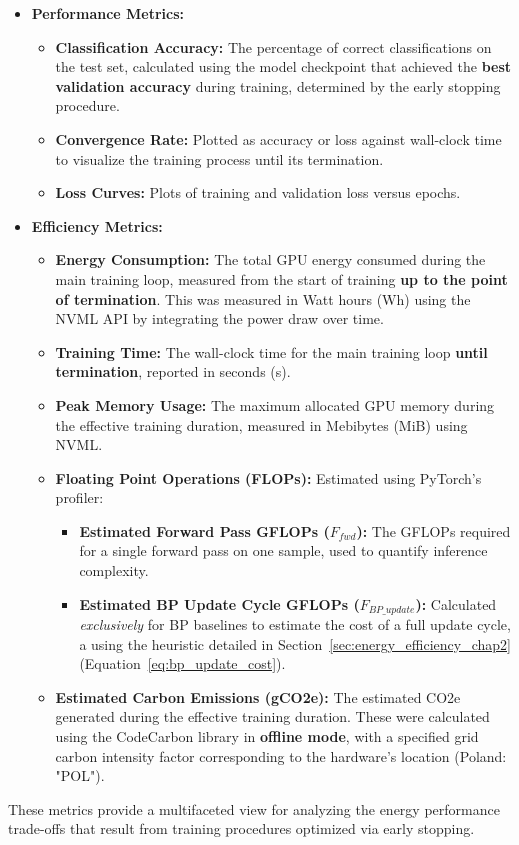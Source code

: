 \begin{itemize}
\item \textbf{Performance Metrics:}
\begin{itemize}
\item \textbf{Classification Accuracy:} The percentage of correct classifications on the test set, calculated using the model checkpoint that achieved the \textbf{best validation accuracy} during training, determined by the early stopping procedure.
\item \textbf{Convergence Rate:} Plotted as accuracy or loss against wall-clock time to visualize the training process until its termination.
\item \textbf{Loss Curves:} Plots of training and validation loss versus epochs.
\end{itemize}
\item \textbf{Efficiency Metrics:}
\begin{itemize}
\item \textbf{Energy Consumption:} The total GPU energy consumed during the main training loop, measured from the start of training \textbf{up to the point of termination}. This was measured in Watt hours (Wh) using the NVML API by integrating the power draw over time.
\item \textbf{Training Time:} The wall-clock time for the main training loop \textbf{until termination}, reported in seconds (s).
\item \textbf{Peak Memory Usage:} The maximum allocated GPU memory during the effective training duration, measured in Mebibytes (MiB) using NVML.
\item \textbf{Floating Point Operations (FLOPs):} Estimated using PyTorch's profiler:
    \begin{itemize}
        \item \textbf{Estimated Forward Pass GFLOPs ($F_{fwd}$):} The GFLOPs required for a single forward pass on one sample, used to quantify inference complexity.
        \item \textbf{Estimated BP Update Cycle GFLOPs ($F_{BP\_update}$):} Calculated \textit{exclusively} for BP baselines to estimate the cost of a full update cycle, a using the heuristic detailed in Section~\ref{sec:energy_efficiency_chap2} (Equation~\ref{eq:bp_update_cost}).
    \end{itemize}
\item \textbf{Estimated Carbon Emissions (gCO2e):} The estimated CO2e generated during the effective training duration. These were calculated using the CodeCarbon library in \textbf{offline mode}, with a specified grid carbon intensity factor corresponding to the hardware's location (Poland: "POL").
\end{itemize}
\end{itemize}
These metrics provide a multifaceted view for analyzing the energy performance trade-offs that result from training procedures optimized via early stopping.

